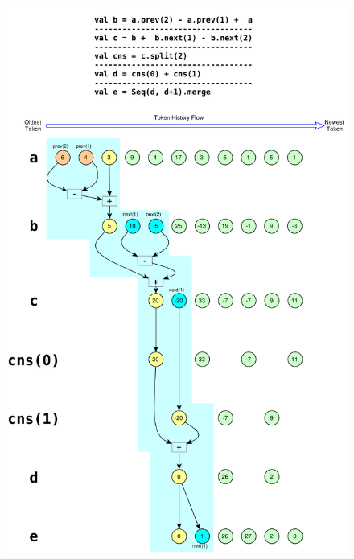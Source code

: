 \begin{figure}[t]
  \centering
  \includegraphics[width=\linewidth]{graphics/dataflow.pdf} 
  \label{fig:Dataflow}
\end{figure}

  
